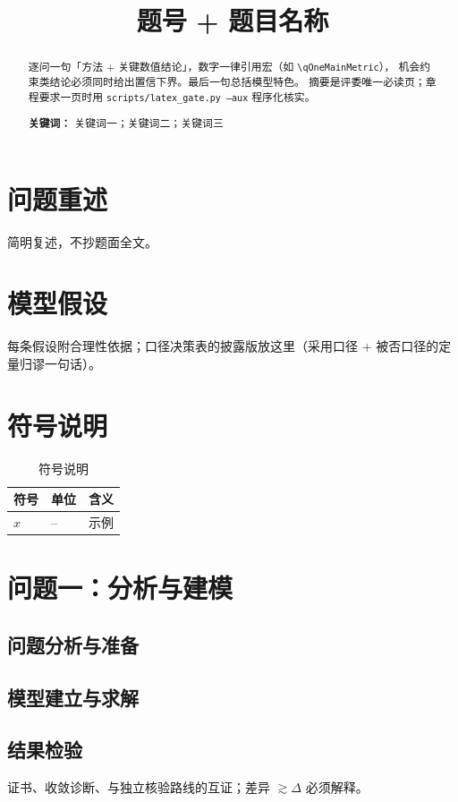 \documentclass[12pt,a4paper]{ctexart}
\title{题号 + 题目名称}
\author{}                       %
\date{}
\begin{document}
\maketitle
\thispagestyle{empty}

\begin{abstract}
逐问一句「方法 + 关键数值结论」，数字一律引用宏（如 \verb|\qOneMainMetric|），
机会约束类结论必须同时给出置信下界。最后一句总括模型特色。
摘要是评委唯一必读页；章程要求一页时用 \texttt{scripts/latex\_gate.py --aux} 程序化核实。

\textbf{关键词：} 关键词一；关键词二；关键词三
\end{abstract}

\newpage
\setcounter{page}{1}

\section{问题重述}
简明复述，不抄题面全文。

\section{模型假设}
每条假设附合理性依据；口径决策表的披露版放这里（采用口径 + 被否口径的定量归谬一句话）。

\section{符号说明}
\begin{table}[htbp]
  \centering
  \caption{符号说明}
  \begin{tabularx}{0.9\textwidth}{llX}
    \toprule
    符号 & 单位 & 含义 \\
    \midrule
    $x$ & -- & 示例 \\
    \bottomrule
  \end{tabularx}
\end{table}

\section{问题一：分析与建模}
\subsection{问题分析与准备}
\subsection{模型建立与求解}
\subsection{结果检验}
证书、收敛诊断、与独立核验路线的互证；差异 $\gtrsim \Delta$ 必须解释。
\end{document}
